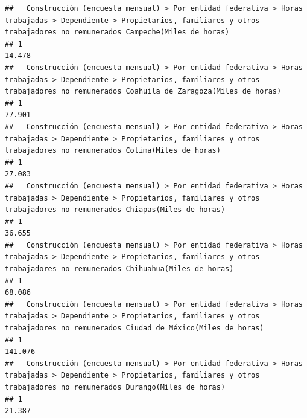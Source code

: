 \documentclass[
]{article}
\begin{document}
\begin{verbatim}
##   Construcción (encuesta mensual) > Por entidad federativa > Horas trabajadas > Dependiente > Propietarios, familiares y otros trabajadores no remunerados Campeche(Miles de horas) 
## 1                                                                                                                                                                             14.478
##   Construcción (encuesta mensual) > Por entidad federativa > Horas trabajadas > Dependiente > Propietarios, familiares y otros trabajadores no remunerados Coahuila de Zaragoza(Miles de horas) 
## 1                                                                                                                                                                                         77.901
##   Construcción (encuesta mensual) > Por entidad federativa > Horas trabajadas > Dependiente > Propietarios, familiares y otros trabajadores no remunerados Colima(Miles de horas) 
## 1                                                                                                                                                                           27.083
##   Construcción (encuesta mensual) > Por entidad federativa > Horas trabajadas > Dependiente > Propietarios, familiares y otros trabajadores no remunerados Chiapas(Miles de horas) 
## 1                                                                                                                                                                            36.655
##   Construcción (encuesta mensual) > Por entidad federativa > Horas trabajadas > Dependiente > Propietarios, familiares y otros trabajadores no remunerados Chihuahua(Miles de horas) 
## 1                                                                                                                                                                              68.086
##   Construcción (encuesta mensual) > Por entidad federativa > Horas trabajadas > Dependiente > Propietarios, familiares y otros trabajadores no remunerados Ciudad de México(Miles de horas) 
## 1                                                                                                                                                                                    141.076
##   Construcción (encuesta mensual) > Por entidad federativa > Horas trabajadas > Dependiente > Propietarios, familiares y otros trabajadores no remunerados Durango(Miles de horas) 
## 1                                                                                                                                                                            21.387

\end{verbatim}
\end{document}
